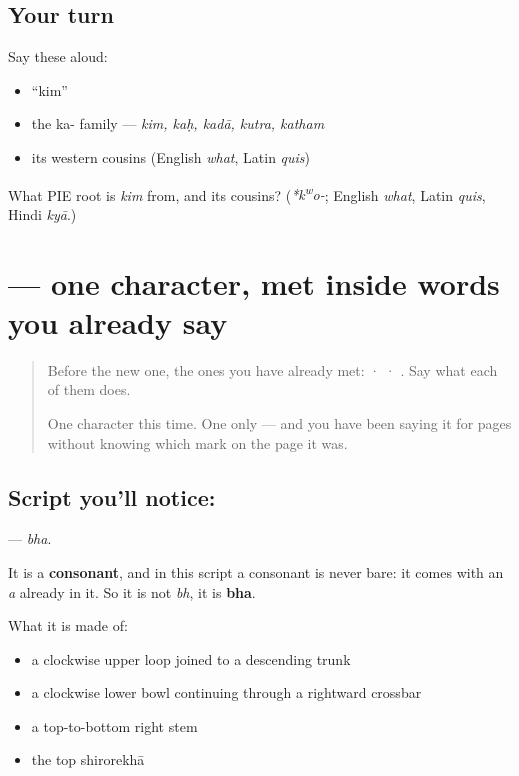 \subsection*{Your turn}
Say these aloud:

\begin{itemize}
\raggedright
  \item \textquotedblleft{}kim\textquotedblright{}
  \item the ka- family — \emph{kim, kaḥ, kadā, kutra, katham}
  \item its western cousins (English \emph{what}, Latin \emph{quis})
\end{itemize}

\begin{tcolorbox}[breakable,colback=teal!4,colframe=teal!35!black,title={Before you move on}]
What PIE root is \emph{kim} from, and its cousins? (\emph{*k\textsuperscript{w}o-}; English \emph{what}, Latin \emph{quis}, Hindi \emph{kyā}.)
\end{tcolorbox}
\section[\texorpdfstring{\sk{भ} (bha)}{भ (bha)}]{ — one character, met inside words you already say}

\label{lesson:SA-S202-letter-bha}



\begin{quote}
Before the new one, the ones you have already met:  ·  · . Say what each of them does.

One character this time. One only — and you have been saying it for pages without knowing which mark on the page it was.
\end{quote}

\subsection*{Script you'll notice: }
\textbf{} — \emph{bha}.

It is a \textbf{consonant}, and in this script a consonant is never bare: it comes with an \emph{a} already in it. So it is not \emph{bh}, it is \textbf{bha}.

What it is made of:

\begin{itemize}
\raggedright
  \item a clockwise upper loop joined to a descending trunk
  \item a clockwise lower bowl continuing through a rightward crossbar
  \item a top-to-bottom right stem
  \item the top shirorekhā
\end{itemize}

